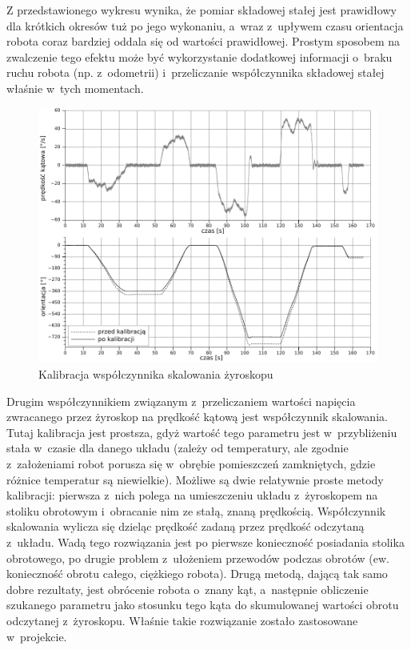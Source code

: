 Z przedstawionego wykresu wynika, że pomiar składowej stałej jest prawidłowy dla
krótkich okresów tuż po jego wykonaniu, a~wraz z~upływem czasu orientacja
robota coraz bardziej oddala się od wartości prawidłowej. Prostym sposobem na
zwalczenie tego efektu może być wykorzystanie dodatkowej informacji o~braku
ruchu robota (np. z~odometrii) i~przeliczanie współczynnika składowej stałej
właśnie w~tych momentach.

\begin{figure}[ht!]
\centering
\includegraphics[width=\textwidth]{../../Common/pomiary/gyro_rot_bw}
\caption{Kalibracja współczynnika skalowania żyroskopu}
\label{fig:gyro_rot}
\end{figure}

Drugim współczynnikiem związanym z~przeliczaniem wartości napięcia zwracanego
przez żyroskop na prędkość kątową jest współczynnik skalowania. Tutaj kalibracja
jest prostsza, gdyż wartość tego parametru jest w~przybliżeniu stała w~czasie
dla danego układu (zależy od temperatury, ale zgodnie z~założeniami robot
porusza się w~obrębie pomieszczeń zamkniętych, gdzie różnice temperatur są
niewielkie). Możliwe są dwie relatywnie proste metody kalibracji: pierwsza
z~nich polega na umieszczeniu układu z~żyroskopem na stoliku obrotowym i~obracanie
nim ze stałą, znaną prędkością. Współczynnik skalowania wylicza się dzieląc
prędkość zadaną przez prędkość odczytaną z~układu. Wadą tego rozwiązania jest po
pierwsze konieczność posiadania stolika obrotowego, po drugie problem
z~ułożeniem przewodów podczas obrotów (ew. konieczność obrotu całego, ciężkiego
robota). Drugą metodą, dającą tak samo dobre rezultaty, jest obrócenie robota
o~znany kąt, a~następnie obliczenie szukanego parametru jako stosunku tego kąta do
skumulowanej wartości obrotu odczytanej z~żyroskopu. Właśnie takie rozwiązanie
zostało zastosowane w~projekcie.


